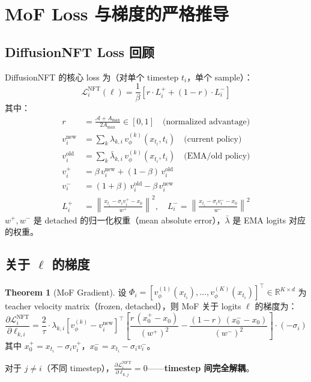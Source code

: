 \documentclass[11pt,a4paper]{article}
\newcommand{\loss}{\mathcal{L}}
\newcommand{\R}{\mathbb{R}}
\newcommand{\vphi}{v_\phi}
\newcommand{\adv}{\mathcal{A}}
\theoremstyle{definition}
\newtheorem{theorem}{Theorem}
\begin{document}
\section{MoF Loss 与梯度的严格推导}
\label{sec:mof_loss}

\subsection{DiffusionNFT Loss 回顾}

DiffusionNFT 的核心 loss 为（对单个 timestep $t_i$，单个 sample）：
\begin{equation}
\loss^{\mathrm{NFT}}_i(\ell) = \frac{1}{\beta}\left[
r \cdot L^+_i + (1-r) \cdot L^-_i
\right]
\label{eq:nft_loss}
\end{equation}
其中：
\begin{align}
r &= \frac{\adv + A_{\max}}{2 A_{\max}} \in [0, 1] \quad\text{(normalized advantage)} \\
v^{\mathrm{new}}_i &= \sum_k \lambda_{k,i}\, \vphi^{(k)}(x_{t_i}, t_i) \quad\text{(current policy)} \\
v^{\mathrm{old}}_i &= \sum_k \bar{\lambda}_{k,i}\, \vphi^{(k)}(x_{t_i}, t_i) \quad\text{(EMA/old policy)} \\
v^+_i &= \beta\, v^{\mathrm{new}}_i + (1-\beta)\, v^{\mathrm{old}}_i \\
v^-_i &= (1+\beta)\, v^{\mathrm{old}}_i - \beta\, v^{\mathrm{new}}_i \\
L^+_i &= \left\|\frac{x_{t_i} - \sigma_i v^+_i - x_0}{w^+}\right\|^2, \quad
L^-_i = \left\|\frac{x_{t_i} - \sigma_i v^-_i - x_0}{w^-}\right\|^2
\end{align}
$w^+, w^-$ 是 detached 的归一化权重（mean absolute error），$\bar{\lambda}$ 是 EMA logits 对应的权重。

\subsection{关于 $\ell$ 的梯度}

\begin{theorem}[MoF Gradient]
\label{thm:mof_grad}
设 $\Phi_i = [\vphi^{(1)}(x_{t_i}), \ldots, \vphi^{(K)}(x_{t_i})]^\top \in \R^{K \times d}$ 为 teacher velocity matrix（frozen, detached），则 MoF 关于 logits $\ell$ 的梯度为：
\begin{equation}
\boxed{
\frac{\partial \loss^{\mathrm{NFT}}_i}{\partial \ell_{k,i}} =
\frac{2}{\tau} \cdot \lambda_{k,i}\left[\vphi^{(k)} - v^{\mathrm{new}}_i\right]^\top
\left[\frac{r\,(x_0^+ - x_0)}{(w^+)^2} - \frac{(1-r)\,(x_0^- - x_0)}{(w^-)^2}\right] \cdot (-\sigma_i)
}
\label{eq:mof_gradient}
\end{equation}
其中 $x_0^+ = x_{t_i} - \sigma_i v^+_i$，$x_0^- = x_{t_i} - \sigma_i v^-_i$。

对于 $j \neq i$（不同 timestep），$\frac{\partial \loss^{\mathrm{NFT}}_i}{\partial \ell_{k,j}} = 0$——\textbf{timestep 间完全解耦}。
\end{theorem}
\end{document}
